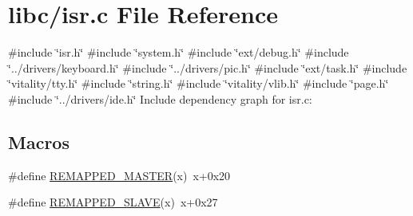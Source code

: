 \hypertarget{a00113}{}\section{libc/isr.c File Reference}
\label{a00113}
{\ttfamily \#include \char`\"{}isr.\+h\char`\"{}}\newline
{\ttfamily \#include \char`\"{}system.\+h\char`\"{}}\newline
{\ttfamily \#include \char`\"{}ext/debug.\+h\char`\"{}}\newline
{\ttfamily \#include \char`\"{}../drivers/keyboard.\+h\char`\"{}}\newline
{\ttfamily \#include \char`\"{}../drivers/pic.\+h\char`\"{}}\newline
{\ttfamily \#include \char`\"{}ext/task.\+h\char`\"{}}\newline
{\ttfamily \#include \char`\"{}vitality/tty.\+h\char`\"{}}\newline
{\ttfamily \#include \char`\"{}string.\+h\char`\"{}}\newline
{\ttfamily \#include \char`\"{}vitality/vlib.\+h\char`\"{}}\newline
{\ttfamily \#include \char`\"{}page.\+h\char`\"{}}\newline
{\ttfamily \#include \char`\"{}../drivers/ide.\+h\char`\"{}}\newline
Include dependency graph for isr.\+c\+:
\subsection*{Macros}
\begin{DoxyCompactItemize}
\item 
\#define \hyperlink{a00113_a1a50e87666fd36809857ecdf02ec1e0e_a1a50e87666fd36809857ecdf02ec1e0e}{R\+E\+M\+A\+P\+P\+E\+D\+\_\+\+M\+A\+S\+T\+ER}(x)~x+0x20
\item 
\#define \hyperlink{a00113_a29460f6684e5755f5e6b832df15dec97_a29460f6684e5755f5e6b832df15dec97}{R\+E\+M\+A\+P\+P\+E\+D\+\_\+\+S\+L\+A\+VE}(x)~x+0x27
\end{DoxyCompactItemize}
